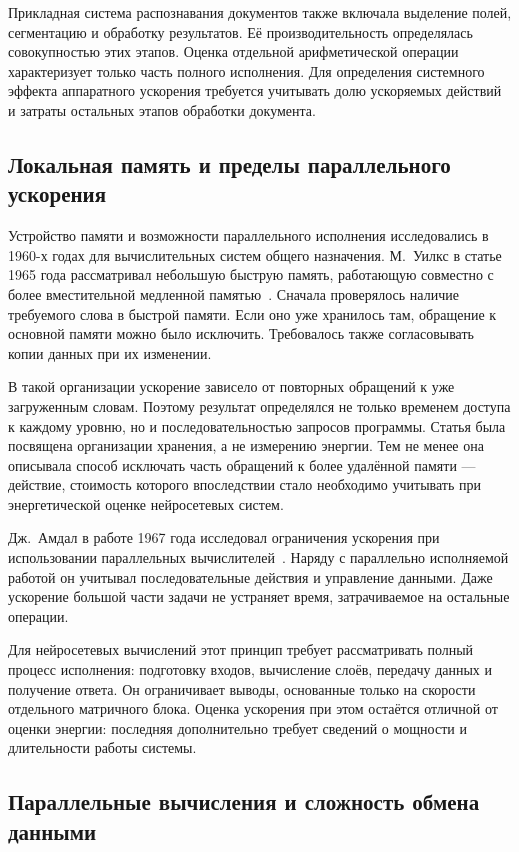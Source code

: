 Прикладная система распознавания документов также включала выделение
полей, сегментацию и обработку результатов. Её производительность
определялась совокупностью этих этапов. Оценка отдельной арифметической
операции характеризует только часть полного исполнения. Для определения
системного эффекта аппаратного ускорения требуется учитывать долю
ускоряемых действий и затраты остальных этапов обработки документа.

\subsection{Локальная память и пределы параллельного ускорения}

Устройство памяти и возможности параллельного исполнения
исследовались в 1960-х годах для вычислительных систем
общего назначения. М.~Уилкс в статье 1965 года рассматривал
небольшую быструю память, работающую совместно с более
вместительной медленной памятью~\cite{wilkes1965}.
Сначала проверялось наличие требуемого слова в быстрой памяти.
Если оно уже хранилось там, обращение к основной памяти
можно было исключить. Требовалось также согласовывать
копии данных при их изменении.

В такой организации ускорение зависело от повторных
обращений к уже загруженным словам. Поэтому результат
определялся не только временем доступа к каждому уровню,
но и последовательностью запросов программы. Статья была
посвящена организации хранения, а не измерению энергии.
Тем не менее она описывала способ исключать часть
обращений к более удалённой памяти — действие, стоимость
которого впоследствии стало необходимо учитывать
при энергетической оценке нейросетевых систем.

Дж.~Амдал в работе 1967 года исследовал ограничения
ускорения при использовании параллельных вычислителей~\cite{amdahl1967}.
Наряду с параллельно исполняемой работой он учитывал
последовательные действия и управление данными.
Даже ускорение большой части задачи не устраняет
время, затрачиваемое на остальные операции.

Для нейросетевых вычислений этот принцип требует
рассматривать полный процесс исполнения: подготовку входов,
вычисление слоёв, передачу данных и получение ответа.
Он ограничивает выводы, основанные только на скорости
отдельного матричного блока. Оценка ускорения при этом
остаётся отличной от оценки энергии: последняя дополнительно
требует сведений о мощности и длительности работы системы.

\subsection{Параллельные вычисления и сложность обмена данными}


